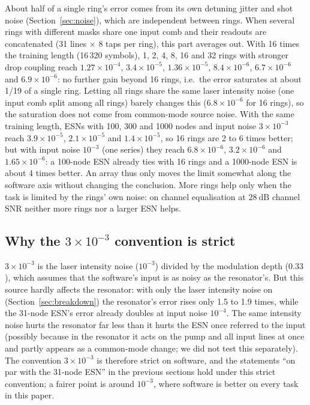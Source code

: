 About half of a single ring's error comes from its own detuning jitter and shot noise (Section~\ref{sec:noise}), which are independent
between rings. When several rings with different masks share one input comb and their readouts are concatenated (31 lines $\times$ 8
taps per ring), this part averages out. With 16 times the training length (16\,320 symbols), 1, 2, 4, 8, 16 and 32 rings with stronger
drop coupling reach $1.27\times10^{-4}$, $3.4\times10^{-5}$, $1.36\times10^{-5}$, $8.4\times10^{-6}$, $6.7\times10^{-6}$ and
$6.9\times10^{-6}$: no further gain beyond 16 rings, i.e.\ the error saturates at about 1/19 of a single ring. Letting all rings share
the same laser intensity noise (one input comb split among all rings) barely changes this ($6.8\times10^{-6}$ for 16 rings), so the
saturation does not come from common-mode source noise. With the same training length, ESNs with 100, 300 and 1000 nodes and input noise
$3\times10^{-3}$ reach $3.9\times10^{-5}$, $2.1\times10^{-5}$ and $1.4\times10^{-5}$, so 16 rings are 2 to 6 times better; but with input
noise $10^{-3}$ (one series) they reach $6.8\times10^{-6}$, $3.2\times10^{-6}$ and $1.65\times10^{-6}$: a 100-node ESN already ties with
16 rings and a 1000-node ESN is about 4 times better. An array thus only moves the limit somewhat along the software axis without
changing the conclusion. More rings help only when the task is limited by the rings' own noise: on channel equalisation at
$28~\mathrm{dB}$ channel SNR neither more rings nor a larger ESN helps.

\subsection{Why the \texorpdfstring{$3\times10^{-3}$}{3e-3} convention is strict}

$3\times10^{-3}$ is the laser intensity noise ($10^{-3}$) divided by the modulation depth ($0.33$), which assumes that the software's
input is as noisy as the resonator's. But this source hardly affects the resonator: with only the laser intensity noise on
(Section~\ref{sec:breakdown}) the resonator's error rises only 1.5 to 1.9 times, while the 31-node ESN's error already doubles at input
noise $10^{-4}$. The same intensity noise hurts the resonator far less than it hurts the ESN once referred to the input (possibly
because in the resonator it acts on the pump and all input lines at once and partly appears as a common-mode change; we did not test
this separately). The convention $3\times10^{-3}$ is therefore strict on software, and the statements ``on par with the 31-node ESN''
in the previous sections hold under this strict convention; a fairer point is around $10^{-3}$, where software is better on every task
in this paper.

